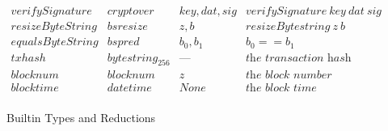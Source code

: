 \documentclass[../main.tex]{subfiles}
\begin{document}
\begin{figure*}[t]
\[\begin{array}{lllll}
        verifySignature   &  cryptover  &   key, dat, sig           & verifySignature ~ key ~ dat ~ sig\\
        
        resizeByteString   &   bsresize   &   z, b   &   resizeBytestring ~ z ~ b\\
        
        equalsByteString  &   bspred   &   b_0 , b_1   & b_0 == b_1\\
        
        txhash   &   bytestring_{256}   &   \textrm{---}  & \textit{the transaction hash}\\
        
        blocknum  &  blocknum  & z & \textit{the block number}\\
        
        blocktime &  \mathit{datetime}  &  \textit{None}  & \textit{the block time}\\
    \end{array}\]
    
    \caption{Builtin Types and Reductions}
    \label{fig:Plutus_core_builtins}
\end{figure*}

\normalsize
\end{document}
